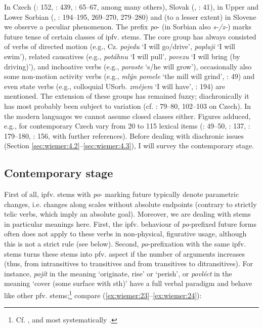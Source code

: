 \documentclass[output=paper,colorlinks,citecolor=brown]{langscibook}
\begin{document}
In Czech (\cite{Šmilauer1947}: 152, \cite{Machek1962}: 439, \cite{Mrhačová1993}: 65--67, among many others), Slovak (\cite{Horecký1957}, \cite{RužičkaDvonč1966}: 41), in Upper and Lower Sorbian (\cite{Michałk1963}, \cite{Scholze2008}: 194--195, 269--270, 279--280) and (to a lesser extent) in Slovene we observe a peculiar phenomenon. The prefix \textit{po}- (in Sorbian also \textit{s-/z-}) marks future tense of certain classes of ipfv. stems. The core group has always consisted of verbs of directed motion (e.g., Cz. \textit{pojedu} ‘I will go/drive’, \textit{popluji} ‘I will swim’), related causatives (e.g., \textit{potáhnu} ‘I will pull’, \textit{povezu} ‘I will bring (by driving)’), and inchoative verbs (e.g., \textit{poroste} ‘s/he will grow’), occasionally also some non-motion activity verbs (e.g.,\textit{ mlýn pomele} ‘the mill will grind’, \cite{Kopečný1962}: 49) and even state verbs (e.g., colloquial USorb. \textit{změjem} ‘I will have’, \cite{Scholze2008}: 194) are mentioned. The extension of these groups has remained fuzzy; diachronically it has most probably been subject to variation (cf. \cite{Šlosar1981}: 79--80, 102--103 on Czech). In the modern languages we cannot assume closed classes either. Figures adduced, e.g., for contemporary Czech vary from 20 to 115 lexical items (\cite{Kopečný1962}: 49--50, \cite{Osolsobě2014}: 137, \cite{ŠevčíkováPanevová2018}: 179--180, \cite{VAGSČ2021}: 156, with further references). Before dealing with diachronic issues (Section \ref{sec:wiemer:4.2}--\ref{sec:wiemer:4.3}), I will survey the contemporary stage.


\subsection{Contemporary stage}\label{sec:wiemer:4.1}

First of all, ipfv. stems with \textit{po}- marking future typically denote parametric changes, i.e. changes along scales without absolute endpoints (contrary to strictly telic verbs, which imply an absolute goal). Moreover, we are dealing with stems in particular meanings here. First, the ipfv. behaviour of \textit{po}-prefixed future forms often does not apply to these verbs in non-physical, figurative usage, although this is not a strict rule (see below). Second, \textit{po}-prefixation with the same ipfv. stems turns these stems into pfv. aspect if the number of arguments increases (thus, from intransitives to transitives and from transitives to ditransitives). For instance, \textit{pojít} in the meaning ‘originate, rise’ or ‘perish’, or \textit{povléct} in the meaning ‘cover (some surface with sth)’ have a full verbal paradigm and behave like other pfv. stems;\footnote{Cf. \citet[544--545]{Bondarko1961}, \citet[238, 248]{Němec2009a} and most systematically \citet[181--186]{ŠevčíkováPanevová2018}.} compare (\ref{ex:wiemer:23}--\ref{ex:wiemer:24}):
\end{document}
